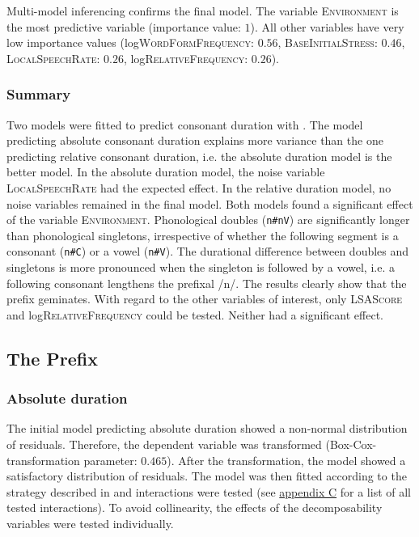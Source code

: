 Multi-model inferencing confirms the final model. The variable \textsc{Environment} is the most predictive variable (importance value: $1$). All other variables have very low importance values  (log\textsc{WordFormFrequency}: $0.56$, \textsc{BaseInitialStress}: $0.46$, \textsc{LocalSpeechRate}: $0.26$, log\textsc{RelativeFrequency}: $0.26$).


\subsubsection{Summary}

Two models were fitted to predict consonant duration with  . The model predicting absolute consonant duration explains more variance than the one predicting relative consonant duration, i.e. the absolute duration model is the better model. In the absolute duration model, the noise variable \textsc{LocalSpeechRate} had the expected effect. In the relative duration model, no noise variables remained in the final model.
 Both models found a significant effect of the variable \textsc{Environment}. Phonological doubles (\texttt{n\#nV}) are significantly longer than phonological singletons, irrespective of whether the following segment is a consonant (\texttt{n\#C}) or a vowel (\texttt{n\#V}). The durational difference between doubles and singletons is more pronounced when the singleton is followed by a vowel, i.e. a following consonant lengthens the prefixal /n/. The results clearly show that the prefix  geminates.
With regard to the other variables of interest, only \textsc{LSAScore} and log\textsc{RelativeFrequency} could be tested. Neither had a significant effect. 


\subsection{The Prefix } \label{in corpus}


\subsubsection{Absolute duration}

The initial model predicting absolute duration showed a non-normal distribution of residuals. Therefore, the dependent variable was  transformed (Box-Cox-transformation  parameter: $0.465$). After the transformation, the model showed a satisfactory distribution of residuals. The model was then fitted according to the strategy described in  and interactions were tested (see \hyperref[Appendix C: Summaries of tested interactions in corpus study]{appendix C} for a list of all tested interactions). 
To avoid collinearity, the effects of the decomposability variables were tested individually.


